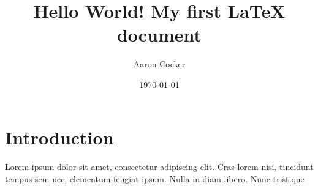 \documentclass[a4paper,12pt]{article}
\begin{document}
\title{Hello World! My first LaTeX document}
\author{Aaron Cocker}
\date{\today}
\maketitle

\section{Introduction}

\paragraph{}
Lorem ipsum dolor sit amet, consectetur adipiscing elit. Cras lorem nisi, tincidunt tempus sem nec, elementum feugiat ipsum. Nulla in diam libero.  Nunc tristique 
\end{document}
